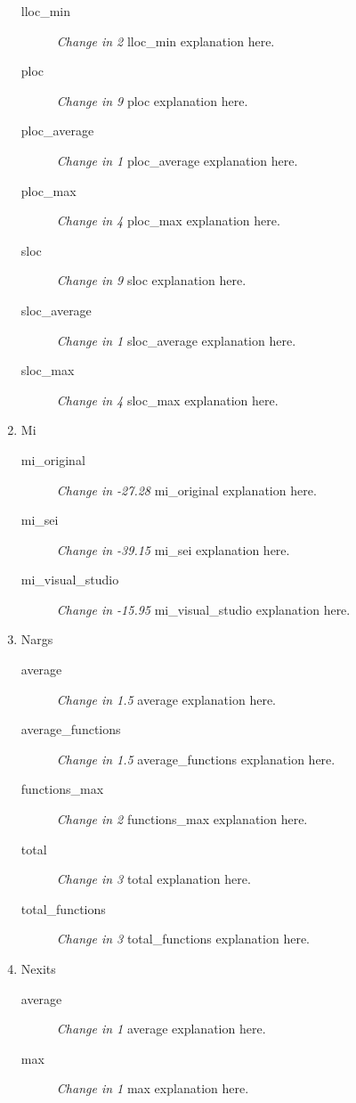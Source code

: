 \begin{enumerate}
\begin{description}
          \item [lloc\_min] \textit{Change in 2} lloc\_min explanation here.
          \item [ploc] \textit{Change in 9} ploc explanation here.
          \item [ploc\_average] \textit{Change in 1} ploc\_average explanation here.
          \item [ploc\_max] \textit{Change in 4} ploc\_max explanation here.
          \item [sloc] \textit{Change in 9} sloc explanation here.
          \item [sloc\_average] \textit{Change in 1} sloc\_average explanation here.
          \item [sloc\_max] \textit{Change in 4} sloc\_max explanation here.
        \end{description}
  \item Mi
        \begin{description}
          \item [mi\_original] \textit{Change in -27.28} mi\_original explanation here.
          \item [mi\_sei] \textit{Change in -39.15} mi\_sei explanation here.
          \item [mi\_visual\_studio] \textit{Change in -15.95} mi\_visual\_studio explanation here.
        \end{description}
  \item Nargs
        \begin{description}
          \item [average] \textit{Change in 1.5} average explanation here.
          \item [average\_functions] \textit{Change in 1.5} average\_functions explanation here.
          \item [functions\_max] \textit{Change in 2} functions\_max explanation here.
          \item [total] \textit{Change in 3} total explanation here.
          \item [total\_functions] \textit{Change in 3} total\_functions explanation here.
        \end{description}
  \item Nexits
        \begin{description}
          \item [average] \textit{Change in 1} average explanation here.
          \item [max] \textit{Change in 1} max explanation here.

\end{description}
\end{enumerate}

